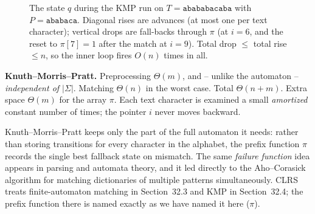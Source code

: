\begin{figure}[H]
\centering
{}
\caption{The state $q$ during the KMP run on $T=\texttt{abababacaba}$ with
$P=\texttt{ababaca}$. Diagonal rises are advances (at most one per text
character); vertical drops are fall-backs through $\pi$ (at $i=6$, and the reset
to $\pi[7]=1$ after the match at $i=9$). Total drop $\le$ total rise $\le n$, so
the inner loop fires $O(n)$ times in all.}
\label{ch31:fig-potential}
\end{figure}

\begin{complexitybox}
\textbf{Knuth--Morris--Pratt.} Preprocessing $\Theta(m)$, and -- unlike the
automaton -- \emph{independent of $|\Sigma|$}. Matching $\Theta(n)$ in the worst
case. Total $\Theta(n+m)$. Extra space $\Theta(m)$ for the array $\pi$. Each text
character is examined a small \emph{amortized} constant number of times; the
pointer $i$ never moves backward.
\end{complexitybox}

\begin{focusbox}
Knuth--Morris--Pratt keeps only the part of the full automaton it needs: rather than storing transitions for every character in the alphabet,
the prefix function $\pi$ records the single best fallback state on mismatch.
The same \emph{failure function} idea appears in parsing and automata theory,
and it led directly to the Aho--Corasick algorithm for matching dictionaries of multiple patterns simultaneously.
CLRS treats finite-automaton matching in Section~32.3 and KMP in Section~32.4;
the prefix function there is named exactly as we have named it here ($\pi$).
\end{focusbox}

